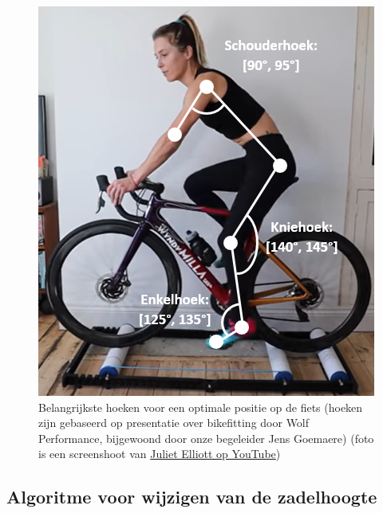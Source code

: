 \documentclass[a4paper,twoside,kulak]{kulakreport}
\begin{document}
\begin{figure}[H]
	\centering
	\includegraphics[width=\textwidth]{bikefit_hoeken_foto}
	\caption{Belangrijkste hoeken voor een optimale positie op de fiets (hoeken zijn gebaseerd op presentatie over bikefitting door Wolf Performance, bijgewoond door onze begeleider Jens Goemaere) (foto is een screenshoot van \href{https://www.youtube.com/watch?v=h7ZEaTmylXk}{Juliet Elliott op YouTube})}
	\label{fig:bikefit}
\end{figure}

\subsection{Algoritme voor wijzigen van de zadelhoogte}
\end{document}
